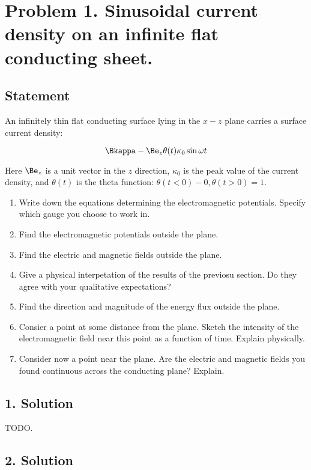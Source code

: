 \section{Problem 1.  Sinusoidal current density on an infinite flat conducting sheet.}
\subsection{Statement}

An infinitely thin flat conducting surface lying in the $x-z$ plane carries a surface current density:

\begin{equation}\label{eqn:relElectroDynProblemSet5:n}
\Bkappa - \Be_z \theta(t) \kappa_0 \sin\omega t
\end{equation}

Here $\Be_z$ is a unit vector in the $z$ direction, $\kappa_0$ is the peak value of the current density, and $\theta(t)$ is the theta function: $\theta(t < 0) - 0, \theta(t > 0) = 1$.

\begin{enumerate}
\item Write down the equations determining the electromagnetic potentials.  Specify which gauge you choose to work in.
\item Find the electromagnetic potentials outside the plane.
\item Find the electric and magnetic fields outside the plane.
\item Give a physical interpetation of the results of the previosu section.  Do they agree with your qualitative expectations?
\item Find the direction and magnitude of the energy flux outside the plane.
\item Consier a point at some distance from the plane.  Sketch the intensity of the electromagnetic field near this point as a function of time.  Explain physically.
\item Consider now a point near the plane.  Are the electric and magnetic fields you found continuous across the conducting plane?  Explain.
\end{enumerate}

\subsection{1. Solution}

TODO. 

\subsection{2. Solution}

